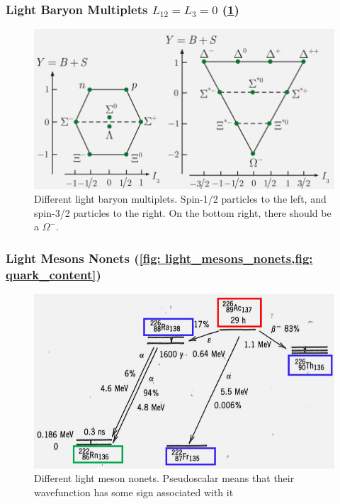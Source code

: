 \subsubsection{Light Baryon Multiplets $L_{12} = L_3 = 0$ (\cref{fig: light_baryon_multiplets})}
\begin{figure}[h!]
\centering
\includegraphics[width = .75\textwidth]{light_baryon_multiplets.png}
\caption{Different light baryon multiplets. Spin-1/2 particles to the left, and spin-3/2 particles to the right. On the bottom right, there should be a $Ω^{-}$.}
\label{fig: light_baryon_multiplets}
\end{figure}

\subsubsection{Light Mesons Nonets (\cref{fig: light_mesons_nonets,fig: quark_content})}





\begin{figure}[hb!]
\centering
\includegraphics[width = .75\textwidth]{light_mesons_nonets.png}
\caption{Different light meson nonets. Pseudoscalar means that their wavefunction has some sign associated with it}
\label{fig: light_mesons_nonets}
\end{figure}


